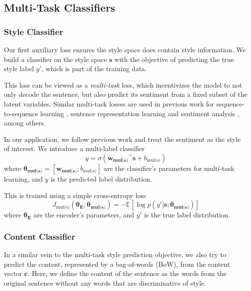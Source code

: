 \documentclass[letterpaper]{article} %
\newcommand{\loss}[1]{J_{\text{#1}}}
\newcommand{\nnweight}[1]{\bm{\theta_{\text{#1}}}}
\newcommand{\weight}[1]{\bm{w_{\text{#1}}}}
\newcommand{\bias}[1]{b_{\text{#1}}}
\begin{document}
\subsection{Multi-Task Classifiers}

\subsubsection{Style Classifier} \label{ssec:multitask-style-objective}

Our first auxiliary loss ensures the style space does contain style information.
We build a classifier on the style space $\bm s$ with the objective of predicting the true style label $y'$, which is part of the training data.

This loss can be viewed as a \textit{multi-task} loss, which incentivizes the model to not only decode the sentence, but also predict its sentiment from a fixed subset of the latent variables.
Similar multi-task losses are used in previous work for sequence-to-sequence learning \cite{luong2015multi}, sentence representation learning \cite{jernite2017discourse} and sentiment analysis \cite{balikas2017multitask}, among others.

In our application, we follow previous work \cite{hu2017toward,shen2017style,fu2017style} and treat the sentiment as the style of interest.
We introduce a multi-label classifier
\begin{equation} \label{eqn:class-pred}
	y = \sigma({\weight{mul(s)}}^\top \bm s + \bias{mul(s)})
\end{equation}
where $\nnweight{mul(s)}=[\weight{mul(s)}; \bias{mul(s)}]$ are the classifier's parameters for multi-task learning, and $y$ is the predicted label distribution.

This is trained using a simple cross-entropy loss
\begin{equation} \label{eqn:style-multi-task-loss}
	\loss{mul(s)}(\nnweight{E};\nnweight{mul(s)}) =
	- \mathbb{E} [\log p(y' | \bm s; \nnweight{mul(s)})]
\end{equation}
where $\nnweight{E}$ are the encoder's parameters, and $y'$ is the true label distribution.

\subsubsection{Content Classifier} \label{ssec:multitask-content-objective}

In a similar vein to the multi-task style prediction objective, we also try to predict the content, represented by a bag-of-words (BoW), from the content vector $\bm c$.
Here, we define the content of the sentence as the words from the original sentence without any words that are discriminative of style.
\end{document}
